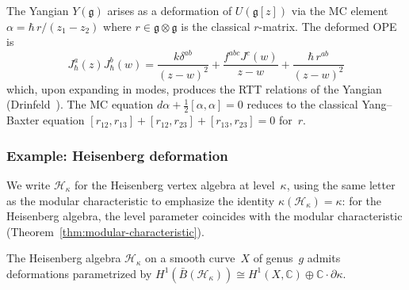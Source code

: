 \begin{proposition}
\label{prop:yangian-from-deformation}
The Yangian $Y(\mathfrak{g})$ arises as a deformation of $U(\mathfrak{g}[z])$
via the MC element
$\alpha = \hbar\, r/(z_1 - z_2)$
where $r \in \mathfrak{g} \otimes \mathfrak{g}$ is the classical
$r$-matrix. The deformed OPE is
\[J^a_\hbar(z)J^b_\hbar(w) = \frac{k\delta^{ab}}{(z-w)^2} + \frac{f^{abc}J^c(w)}{z-w} + \frac{\hbar\, r^{ab}}{(z-w)^2}\]
which, upon expanding in modes, produces the RTT relations
of the Yangian \textup{(}Drinfeld~\cite{Drinfeld85}\textup{)}.
The MC equation $d\alpha + \frac{1}{2}[\alpha, \alpha] = 0$
reduces to the classical Yang--Baxter equation
$[r_{12}, r_{13}] + [r_{12}, r_{23}] + [r_{13}, r_{23}] = 0$
for~$r$.
\end{proposition}

\subsubsection{Example: Heisenberg deformation}

\begin{convention}
\label{conv:heisenberg-kappa-notation}
We write $\mathcal{H}_\kappa$ for the Heisenberg vertex algebra at
level~$\kappa$, using the same letter as the modular characteristic
to emphasize the identity $\kappa(\mathcal{H}_\kappa) = \kappa$: for
the Heisenberg algebra, the level parameter coincides with the modular
characteristic (Theorem~\textup{\ref{thm:modular-characteristic}}).
\end{convention}

\begin{proposition}
\label{prop:deforming-heisenberg}
The Heisenberg algebra $\mathcal{H}_\kappa$ on a smooth curve~$X$ of
genus~$g$ admits deformations parametrized by
$H^1(\bar{B}(\mathcal{H}_\kappa)) \cong H^1(X, \mathbb{C}) \oplus
\mathbb{C} \cdot \partial\kappa$.
\end{proposition}


